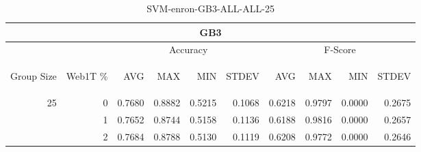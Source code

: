 \begin{center}
\begin{table}[htbp] 
 \begin{center}
\begin{tabular}{ | r | r | r | r | r | r | r | r | r | r |}
\hline
\multicolumn{10}{|c|}{GB3}\\
\hline
 & & \multicolumn{4}{|c|}{Accuracy} & \multicolumn{4}{|c|}{F-Score}\\ \cline{3-10}
\begin{sideways}Group Size\end{sideways} & \begin{sideways}Web1T \%\end{sideways} & \begin{sideways}AVG\end{sideways} & \begin{sideways}MAX\end{sideways} & \begin{sideways}MIN\end{sideways} & \begin{sideways}STDEV\end{sideways} & \begin{sideways}AVG\end{sideways} & \begin{sideways}MAX\end{sideways} & \begin{sideways}MIN\end{sideways} & \begin{sideways}STDEV\end{sideways}\\
\hline
\multirow{2}{*}{25}
 & 0 & 0.7680 & 0.8882 & 0.5215 & 0.1068 & 0.6218 & 0.9797 & 0.0000 & 0.2675\\ \cline{2-10}
 & 1 & 0.7652 & 0.8744 & 0.5158 & 0.1136 & 0.6188 & 0.9816 & 0.0000 & 0.2657\\ \cline{2-10}
 & 2 & 0.7684 & 0.8788 & 0.5130 & 0.1119 & 0.6208 & 0.9772 & 0.0000 & 0.2646\\ \cline{2-10}
\hline
\end{tabular}
\caption{SVM-enron-GB3-ALL-ALL-25}
\label{table:SVM-enron-GB3-ALL-ALL-25}
\end{center}
 \end{table}
\end{center}

